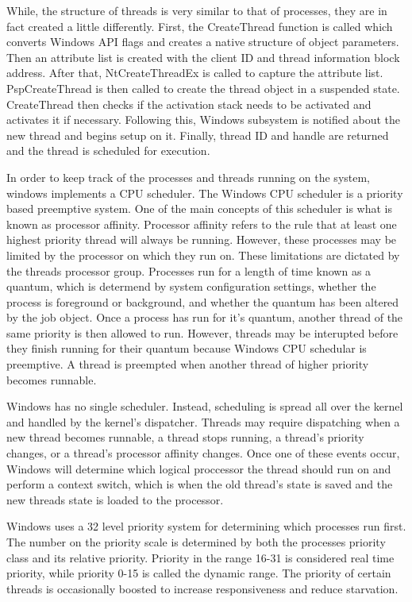 \documentclass[journal,letterpaper,draftclsnofoot,onecolumn,10pt]{IEEEtran}
\begin{document}
While, the structure of threads is very similar to that of processes, they are in fact created a little differently. First, the CreateThread function is called which converts Windows API flags and creates a native structure of object parameters. Then an attribute list is created with the client ID and thread information block address. After that, NtCreateThreadEx is called to capture the attribute list. PspCreateThread is then called to create the thread object in a suspended state. CreateThread then checks if the activation stack needs to be activated and activates it if necessary. Following this, Windows subsystem is notified about the new thread and begins setup on it. Finally, thread ID and handle are returned and the thread is scheduled for execution.\cite{1ris12}

In order to keep track of the processes and threads running on the system, windows implements a CPU scheduler. The Windows CPU scheduler is a priority based preemptive system. One of the main concepts of this scheduler is what is known as processor affinity. Processor affinity refers to the rule that at least one highest priority thread will always be running. However, these processes may be limited by the processor on which they run on. These limitations are dictated by the threads processor group. Processes run for a length of time known as a quantum, which is determend by system configuration settings, whether the process is foreground or background, and whether the quantum has been altered by the job object. Once a process has run for it's quantum, another thread of the same priority is then allowed to run. However, threads may be interupted before they finish running for their quantum because Windows CPU schedular is preemptive. A thread is preempted when another thread of higher priority becomes runnable.\cite{1ris12}

Windows has no single scheduler. Instead, scheduling is spread all over the kernel and handled by the kernel's dispatcher. Threads may require dispatching when a new thread becomes runnable, a thread stops running, a thread's priority changes, or a thread's processor affinity changes. Once one of these events occur, Windows will determine which logical proccessor the thread should run on and perform a context switch, which is when the old thread's state is saved and the new threads state is loaded to the processor.\cite{1ris12}

Windows uses a 32 level priority system for determining which processes run first. The number on the priority scale is determined by both the processes priority class and its relative priority. Priority in the range 16-31 is considered real time priority, while priority 0-15 is called the dynamic range. The priority of certain threads is occasionally boosted to increase responsiveness and reduce starvation.\cite{1ris12}
\end{document}
